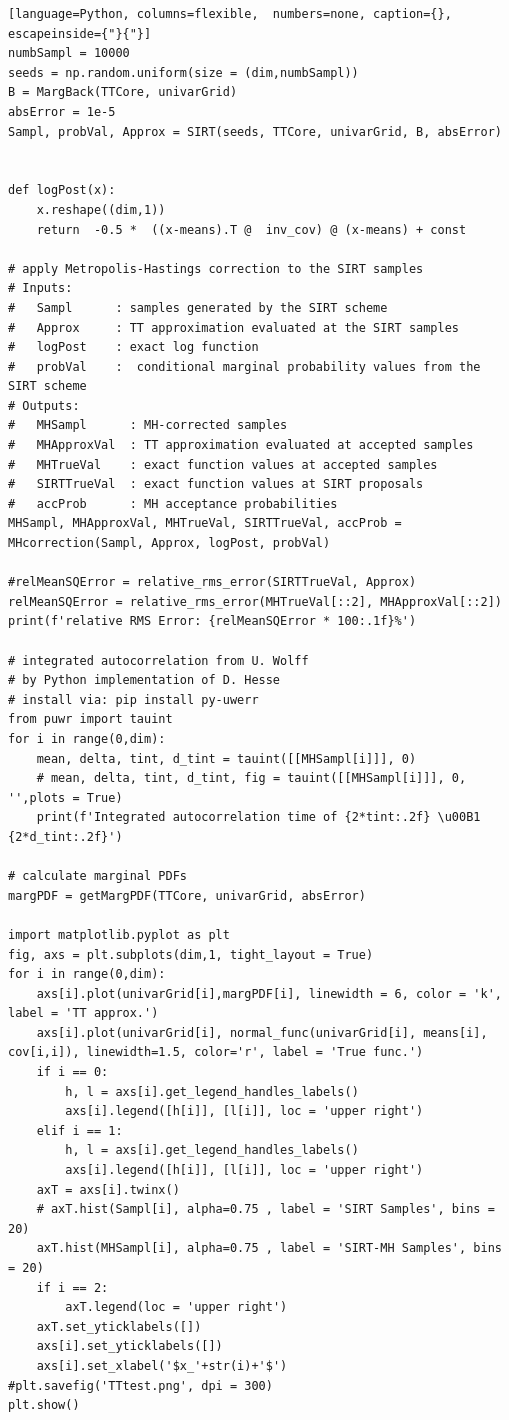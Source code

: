 \begin{lstlisting}[language=Python, columns=flexible,  numbers=none, caption={}, escapeinside={"}{"}]
numbSampl = 10000
seeds = np.random.uniform(size = (dim,numbSampl))
B = MargBack(TTCore, univarGrid)
absError = 1e-5
Sampl, probVal, Approx = SIRT(seeds, TTCore, univarGrid, B, absError)


def logPost(x):
	x.reshape((dim,1))
	return  -0.5 *  ((x-means).T @  inv_cov) @ (x-means) + const
	
# apply Metropolis-Hastings correction to the SIRT samples
# Inputs:
#   Sampl      : samples generated by the SIRT scheme
#   Approx     : TT approximation evaluated at the SIRT samples
#   logPost    : exact log function
#   probVal    :  conditional marginal probability values from the SIRT scheme
# Outputs:
#   MHSampl      : MH-corrected samples
#   MHApproxVal  : TT approximation evaluated at accepted samples
#   MHTrueVal    : exact function values at accepted samples
#   SIRTTrueVal  : exact function values at SIRT proposals
#   accProb      : MH acceptance probabilities
MHSampl, MHApproxVal, MHTrueVal, SIRTTrueVal, accProb = MHcorrection(Sampl, Approx, logPost, probVal)

#relMeanSQError = relative_rms_error(SIRTTrueVal, Approx)
relMeanSQError = relative_rms_error(MHTrueVal[::2], MHApproxVal[::2])
print(f'relative RMS Error: {relMeanSQError * 100:.1f}%')

# integrated autocorrelation from U. Wolff
# by Python implementation of D. Hesse
# install via: pip install py-uwerr
from puwr import tauint
for i in range(0,dim):
	mean, delta, tint, d_tint = tauint([[MHSampl[i]]], 0)
	# mean, delta, tint, d_tint, fig = tauint([[MHSampl[i]]], 0, '',plots = True)
	print(f'Integrated autocorrelation time of {2*tint:.2f} \u00B1 {2*d_tint:.2f}')

# calculate marginal PDFs
margPDF = getMargPDF(TTCore, univarGrid, absError)

import matplotlib.pyplot as plt
fig, axs = plt.subplots(dim,1, tight_layout = True)
for i in range(0,dim):
	axs[i].plot(univarGrid[i],margPDF[i], linewidth = 6, color = 'k', label = 'TT approx.')
	axs[i].plot(univarGrid[i], normal_func(univarGrid[i], means[i], cov[i,i]), linewidth=1.5, color='r', label = 'True func.')
	if i == 0:
		h, l = axs[i].get_legend_handles_labels()
		axs[i].legend([h[i]], [l[i]], loc = 'upper right')
	elif i == 1:
		h, l = axs[i].get_legend_handles_labels()
		axs[i].legend([h[i]], [l[i]], loc = 'upper right')
	axT = axs[i].twinx()
	# axT.hist(Sampl[i], alpha=0.75 , label = 'SIRT Samples', bins = 20)
	axT.hist(MHSampl[i], alpha=0.75 , label = 'SIRT-MH Samples', bins = 20)
	if i == 2:
		axT.legend(loc = 'upper right')
	axT.set_yticklabels([])
	axs[i].set_yticklabels([])
	axs[i].set_xlabel('$x_'+str(i)+'$')
#plt.savefig('TTtest.png', dpi = 300)
plt.show()
\end{lstlisting}
\clearpage

